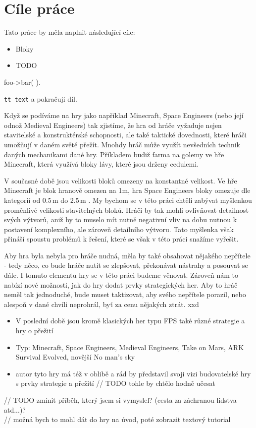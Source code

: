 \section{Cíle práce}
Tato práce by měla naplnit následující cíle:
\begin{itemize}
	\item Bloky
	\item TODO
\end{itemize}



\begin{code}
  foo->bar( ).
\end{code}

{\tt tt text} a pokračuji díl.


Když se podíváme na hry jako například Minecraft, Space Engineers (nebo její odnož Medieval Engineers) tak zjistíme, že hra od hráče vyžaduje nejen stavitelské a konstruktérské schopnosti, ale také taktické dovednosti, které hráči umožňují v daném světě přežít. Mnohdy hráč může využít nevšedních technik daných mechanikami dané hry. Příkladem budiž farma na golemy ve hře Minecraft, která využívá bloky lávy, které jsou drženy cedulemi\citep{minecraft_tut_farm}.

V současné době jsou velikosti bloků omezeny na konstantné velikost. Ve hře Minecraft je blok hranově omezen na 1m, hra Space Engineers bloky omezuje dle kategorií od 0.5\,\rm m do 2.5\,\rm m \citep{se_blocks_wiki}.
My bychom se v této práci chtěli zabývat myšlenkou proměnlivé velikosti stavitelných bloků. Hráči by tak mohli ovlivňovat detailnost svých výtvorů, aniž by to muselo mít nutně negativní vliv na dobu nutnou k postavení komplexního, ale zároveň detailního výtvoru. Tato myšlenka však přináší spoustu problémů k řešení, které se však v této práci snažíme vyřešit.

Aby hra byla nebyla pro hráče nudná, měla by také obsahovat nějakého nepřítele - tedy něco, co bude hráče nutit se zlepšovat, překonávat nástrahy a posouvat se dále. I tomuto elementu hry se v této práci budeme věnovat. Zároveň nám to nabízí nové možnosti, jak do hry dodat prvky strategických her. Aby to hráč neměl tak jednoduché, bude muset taktizovat, aby svého nepřítele porazil, nebo alespoň v dané chvíli neprohrál, byť za cenu nějakých ztrát. xxd

\begin{itemize}
	\item V poslední době jsou kromě klasických her typu FPS také různé strategie a hry o přežití
	\item Typ: Minecraft, Space Engineers, Medieval Engineers, Take on Mars, ARK Survival Evolved, novější No man's sky
	\item autor tyto hry má též v oblibě a rád by představil svoji vizi budovatelské hry s prvky strategie a přežití		// TODO tohle by chtělo hodně učesat
\end{itemize}		

// TODO zmínit příběh, který jsem si vymyslel? (cesta za záchranou lidstva atd...)? \\

// možná bych to mohl dát do hry na úvod, poté zobrazit textový tutorial

